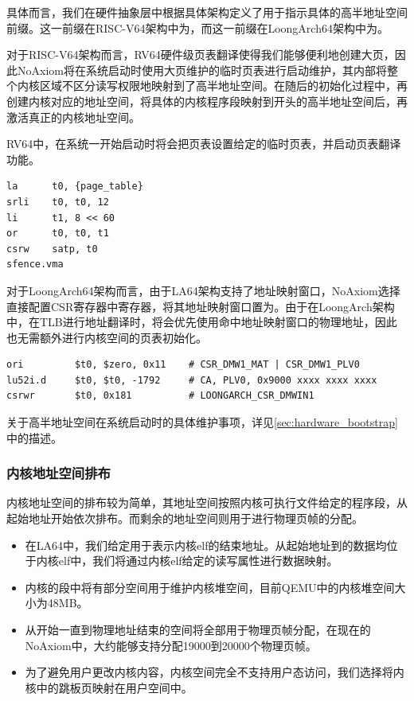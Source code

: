 \documentclass{article}
\begin{document}
具体而言，我们在硬件抽象层中根据具体架构定义了用于指示具体的高半地址空间前缀。这一前缀在RISC-V64架构中为，而这一前缀在LoongArch64架构中为。

对于RISC-V64架构而言，RV64硬件级页表翻译使得我们能够便利地创建大页，因此NoAxiom将在系统启动时使用大页维护的临时页表进行启动维护，其内部将整个内核区域不区分读写权限地映射到了高半地址空间。在随后的初始化过程中，再创建内核对应的地址空间，将具体的内核程序段映射到开头的高半地址空间后，再激活真正的内核地址空间。

RV64中，在系统一开始启动时将会把页表设置给定的临时页表，并启动页表翻译功能。

\begin{lstlisting}
la      t0, {page_table}
srli    t0, t0, 12
li      t1, 8 << 60
or      t0, t0, t1
csrw    satp, t0
sfence.vma
\end{lstlisting}

对于LoongArch64架构而言，由于LA64架构支持了地址映射窗口，NoAxiom选择直接配置CSR寄存器中寄存器，将其地址映射窗口置为。由于在LoongArch架构中，在TLB进行地址翻译时，将会优先使用命中地址映射窗口的物理地址，因此也无需额外进行内核空间的页表初始化。

\begin{lstlisting}
ori         $t0, $zero, 0x11    # CSR_DMW1_MAT | CSR_DMW1_PLV0
lu52i.d     $t0, $t0, -1792     # CA, PLV0, 0x9000 xxxx xxxx xxxx
csrwr       $t0, 0x181          # LOONGARCH_CSR_DMWIN1
\end{lstlisting}

关于高半地址空间在系统启动时的具体维护事项，详见\ref{sec:hardware_bootstrap}中的描述。

\subsubsection{内核地址空间排布}

内核地址空间的排布较为简单，其地址空间按照内核可执行文件给定的程序段，从起始地址开始依次排布。而剩余的地址空间则用于进行物理页帧的分配。

\begin{itemize}
    \item 在LA64中，我们给定用于表示内核elf的结束地址。从起始地址到的数据均位于内核elf中，我们将通过内核elf给定的读写属性进行数据映射。
    \item 内核的段中将有部分空间用于维护内核堆空间，目前QEMU中的内核堆空间大小为48MB。
    \item 从开始一直到物理地址结束的空间将全部用于物理页帧分配，在现在的NoAxiom中，大约能够支持分配19000到20000个物理页帧。
    \item 为了避免用户更改内核内容，内核空间完全不支持用户态访问，我们选择将内核中的跳板页映射在用户空间中。
\end{itemize}
\end{document}
